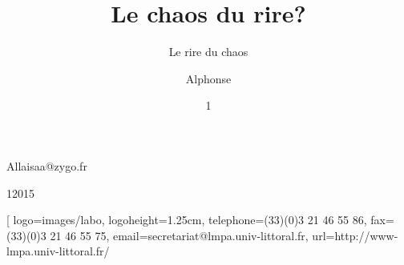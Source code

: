 %
%
\author{Alphonse}{Allais}{aa@zygo.fr}
%
\title[Laugh's Chaos]{Le chaos du rire?}
%
\subtitle[Chaos' laugh]{Le rire du chaos}
%
%
%
\date{1}{1}{2015}
%
\subject[Chaotic Laugh]{Rire chaotique}
%
%
%
%
%
%
\laboratory[
logo=images/labo,
logoheight=1.25cm,
telephone=(33)(0)3 21 46 55 86,
fax=(33)(0)3 21 46 55 75,
email=secretariat@lmpa.univ-littoral.fr,
url=http://www-lmpa.univ-littoral.fr/
